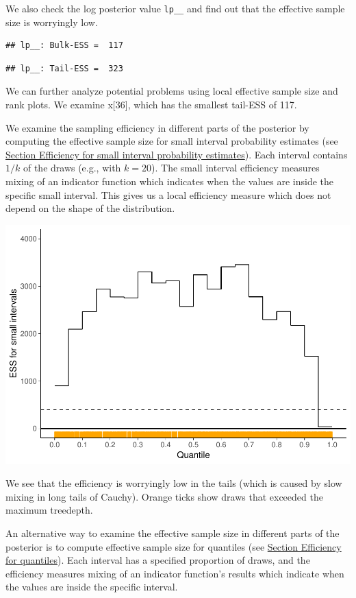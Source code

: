 \documentclass[american,]{article}
\begin{document}
We also check the log posterior value \texttt{lp\_\_} and find out that
the effective sample size is worryingly low.

\begin{verbatim}
## lp__: Bulk-ESS =  117
\end{verbatim}

\begin{verbatim}
## lp__: Tail-ESS =  323
\end{verbatim}

We can further analyze potential problems using local effective sample
size and rank plots. We examine x{[}36{]}, which has the smallest
tail-ESS of 117.

We examine the sampling efficiency in different parts of the posterior
by computing the effective sample size for small interval probability
estimates (see \protect\hyperlink{small_interval_S_eff}{Section
Efficiency for small interval probability estimates}). Each interval
contains \(1/k\) of the draws (e.g., with \(k=20\)). The small interval
efficiency measures mixing of an indicator function which indicates when
the values are inside the specific small interval. This gives us a local
efficiency measure which does not depend on the shape of the
distribution.

\includegraphics{graphics/local-ess-fit-nom-2-1.pdf}

We see that the efficiency is worryingly low in the tails (which is
caused by slow mixing in long tails of Cauchy). Orange ticks show draws
that exceeded the maximum treedepth.

An alternative way to examine the effective sample size in different
parts of the posterior is to compute effective sample size for quantiles
(see \protect\hyperlink{quantile_S_eff}{Section Efficiency for
quantiles}). Each interval has a specified proportion of draws, and the
efficiency measures mixing of an indicator function's results which
indicate when the values are inside the specific interval.
\end{document}

